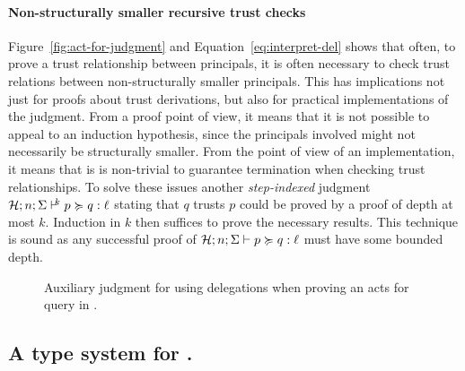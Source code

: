 \paragraph{Non-structurally smaller recursive trust checks}
Figure~\ref{fig:act-for-judgment} and Equation~\eqref{eq:interpret-del} shows that often, to prove a trust relationship between principals, it is often necessary to check trust relations between non-structurally smaller principals. This has implications not just for proofs about trust derivations, but also for practical implementations of the judgment. From a proof point of view, it means that it is not possible to appeal to an induction hypothesis, since the principals involved might not necessarily be structurally smaller. From the point of view of an implementation, it means that is is non-trivial to guarantee termination when checking trust relationships. To solve these issues another \emph{step-indexed} judgment $\actsforquerycount{\Assumps; n; \env}{p}{q}{\level}{k}$ stating that $q$ trusts $p$ could be proved by a proof of depth at most $k$. Induction in $k$ then suffices to prove the necessary results. This technique is sound as any successful proof of $\actsforquery{\Assumps; n; \env}{p}{q}{\level}$ must have some bounded depth.

\begin{figure}
    \centering
    \caption{Auxiliary judgment for using delegations when proving an acts for query in \lang.}
    \label{fig:act-for-judgment-del}
\end{figure}

\subsection{A type system for \lang.}

